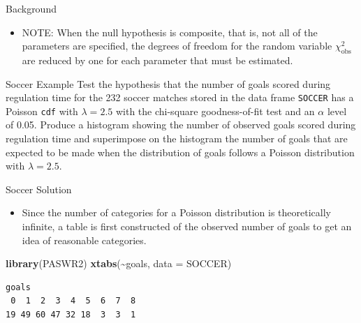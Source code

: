 \documentclass[
  ignorenonframetext,
]{beamer}
\newenvironment{Shaded}{\begin{snugshade}}{\end{snugshade}}
\newcommand{\AttributeTok}[1]{\textcolor[rgb]{0.13,0.29,0.53}{#1}}
\newcommand{\FunctionTok}[1]{\textcolor[rgb]{0.13,0.29,0.53}{\textbf{#1}}}
\newcommand{\NormalTok}[1]{#1}
\newcommand{\SpecialCharTok}[1]{\textcolor[rgb]{0.81,0.36,0.00}{\textbf{#1}}}
\providecommand{\tightlist}{%
  \setlength{\itemsep}{0pt}\setlength{\parskip}{0pt}}
\begin{document}
\begin{frame}{Background}
\protect\hypertarget{background-5}{}
\begin{itemize}
\tightlist
\item
  NOTE: When the null hypothesis is composite, that is, not all of the
  parameters are specified, the degrees of freedom for the random
  variable \(\chi_\text{obs}^2\) are reduced by one for each parameter
  that must be estimated.
\end{itemize}
\end{frame}

\begin{frame}[fragile]{Soccer Example}
\protect\hypertarget{soccer-example}{}
Test the hypothesis that the number of goals scored during regulation
time for the 232 soccer matches stored in the data frame \texttt{SOCCER}
has a Poisson \texttt{cdf} with \(\lambda=2.5\) with the chi-square
goodness-of-fit test and an \(\alpha\) level of 0.05. Produce a
histogram showing the number of observed goals scored during regulation
time and superimpose on the histogram the number of goals that are
expected to be made when the distribution of goals follows a Poisson
distribution with \(\lambda=2.5\).
\end{frame}

\begin{frame}[fragile]{Soccer Solution}
\protect\hypertarget{soccer-solution}{}
\begin{itemize}
\tightlist
\item
  Since the number of categories for a Poisson distribution is
  theoretically infinite, a table is first constructed of the observed
  number of goals to get an idea of reasonable categories.
\end{itemize}

\begin{Shaded}
\begin{Highlighting}[]
\FunctionTok{library}\NormalTok{(PASWR2)}
\FunctionTok{xtabs}\NormalTok{(}\SpecialCharTok{\textasciitilde{}}\NormalTok{goals, }\AttributeTok{data =}\NormalTok{ SOCCER)}
\end{Highlighting}
\end{Shaded}

\begin{verbatim}
goals
 0  1  2  3  4  5  6  7  8 
19 49 60 47 32 18  3  3  1 
\end{verbatim}
\end{frame}
\end{document}

